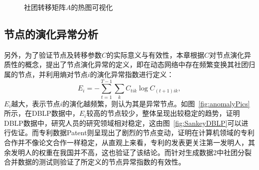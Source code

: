 \begin{figure}[!htbp]
	\centering
	\;\;\;\;
	\caption{社团转移矩阵$A$的热图可视化}%
\label{fig:block}
\end{figure}

\subsection{节点的演化异常分析}
另外，为了验证节点及转移参数$C$的实际意义与有效性，本章根据$C$对节点演化异质性的概念，提出了节点演化异常的定义，即在动态网络中存在频繁变换其社团归属的节点，并利用熵对节点$i$的演化异常指数进行定义：
\begin{equation}
	E_i = -\sum_{t=1}^{T-1} \sum_{k} C_{tik} \log C_{(t+1)ik},
	\label{Nodeanomaly3}
\end{equation}
$E_i$越大，表示节点$i$的演化越频繁，则认为其是异常节点。如图~\ref{fig:anomalyPics}所示，在DBLP数据中，$E_i$较高的节点较少，整体呈现出较稳定的趋势，证明DBLP数据中，研究人员的研究领域相对稳定，这由图~\ref{fig:SankeyDBLP}可以进行佐证。而专利数据Patent则呈现出了剧烈的节点变动，证明在计算机领域的专利合作并不像论文合作一样稳定，从直观上来看，专利的发表更关注第一发明人，其余发明人的权重在我国并不高，这也验证了该结论。而针对生成数据2中社团分裂合并数据的测试则验证了所定义的节点异常指数的有效性。


